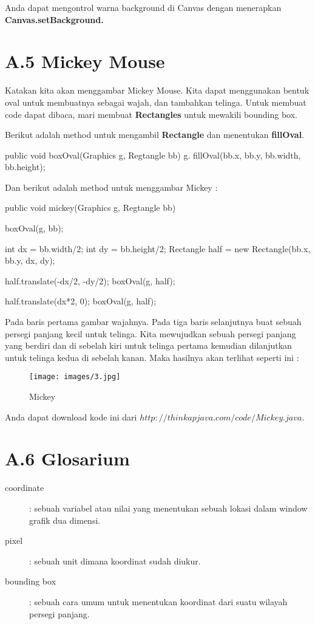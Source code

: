 Anda dapat mengontrol warna background di Canvas dengan menerapkan \textbf{Canvas.setBackground.}

\section{A.5 Mickey Mouse}
Katakan kita akan menggambar Mickey Mouse. Kita dapat menggunakan bentuk oval untuk membuatnya sebagai wajah, dan tambahkan telinga. Untuk membuat code dapat dibaca, mari membuat \textbf{Rectangles} untuk mewakili bounding box.

Berikut adalah method untuk mengambil \textbf{Rectangle} dan menentukan \textbf{fillOval}.

\begin{list}
	public void boxOval(Graphics g, Regtangle bb) {
		g. fillOval(bb.x, bb.y, bb.width, bb.height);
	}
\end{list}

Dan berikut adalah method untuk menggambar Mickey :
\begin{list}
	public void mickey(Graphics g, Regtangle bb) {
		boxOval(g, bb);
		
		int dx = bb.width/2;
		int dy = bb.height/2;
		Rectangle half = new Rectangle(bb.x, bb.y, dx, dy);
		
		half.translate(-dx/2, -dy/2);
		boxOval(g, half);
		
		half.translate(dx*2, 0);
		boxOval(g, half);
	}
\end{list}

Pada baris pertama gambar wajahnya. Pada tiga baris selanjutnya buat sebuah persegi panjang kecil untuk telinga. Kita mewujudkan sebuah persegi panjang yang berdiri dan di sebelah kiri untuk telinga pertama kemudian dilanjutkan untuk telinga kedua di sebelah kanan.
Maka hasilnya akan terlihat seperti ini :
\begin{figure}[H]
	\centering \texttt{[image: images/3.jpg]}
	\caption{Mickey}
	\label{fig:binaryTreeRekursif}
\end{figure}

Anda dapat download kode ini dari $http://thinkapjava.com/code/Mickey.java.$

\section{A.6 Glosarium}
\begin{description}
	\item[coordinate] : sebuah variabel atau nilai yang menentukan sebuah lokasi dalam window grafik dua dimensi.
\end{description}
\begin{description}
	\item[pixel] : sebuah unit dimana koordinat sudah diukur.
\end{description}
\begin{description}
	\item[bounding box] : sebuah cara umum untuk menentukan koordinat dari suatu wilayah persegi panjang.
\end{description}

